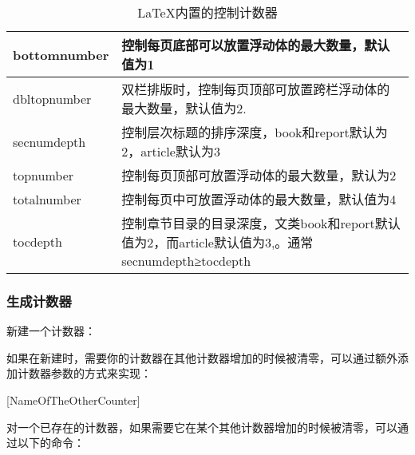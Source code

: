 
    \begin{center}
        \setlength\tablewidth{\dimexpr (\textwidth -4\tabcolsep)}
        \begin{table}[H]
            \begin{tabular}{|p{0.20\tablewidth}<{\centering}|p{0.80\tablewidth}<{\centering}|}
                \hline
                bottomnumber&控制每页底部可以放置浮动体的最大数量，默认值为1\\
                \hline
                dbltopnumber&双栏排版时，控制每页顶部可放置跨栏浮动体的最大数量，默认值为2.\\
                \hline
                secnumdepth&控制层次标题的排序深度，book和report默认为2，article默认为3\\
                \hline
                topnumber&控制每页顶部可放置浮动体的最大数量，默认为2\\
                \hline
                totalnumber&控制每页中可放置浮动体的最大数量，默认值为4\\
                \hline
                tocdepth&控制章节目录的目录深度，文类book和report默认值为2，而article默认值为3,。通常secnumdepth≥tocdepth\\
                \hline
            \end{tabular}
            \caption{\LaTeX{}内置的控制计数器}
        \end{table}
    \end{center}

    \subsubsection{生成计数器}
    新建一个计数器：
    \begin{texcode}
    \end{texcode}
    如果在新建时，需要你的计数器在其他计数器增加的时候被清零，可以通过额外添加计数器参数的方式来实现：
    \begin{texcode}
        [NameOfTheOtherCounter]
    \end{texcode}
    对一个已存在的计数器，如果需要它在某个其他计数器增加的时候被清零，可以通过以下的命令：
    \begin{texcode}
    \end{texcode}
    
